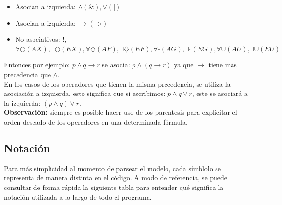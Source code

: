 \documentclass[11pt]{article}
\begin{document}
  \begin{itemize}
    \item Asocian a izquierda: $\land (\&) , \lor (|)$
    \item Asocian a izquierda: $\rightarrow (\texttt{->})$
    \item No asociativos: !, $\forall \bigcirc (AX), \exists \bigcirc (EX), \forall \diamondsuit (AF), \exists \diamondsuit (EF),
          \forall \square (AG), \exists \square (EG), \forall \cup (AU), \exists \cup (EU)$
  \end{itemize}

  Entonces por ejemplo: $p \land q \rightarrow r$ se asocia: $p \land (q \rightarrow r)$
  ya que $\rightarrow$ tiene más precedencia que $\land$. \\
  
  En los casos de los operadores que tienen la misma precedencia, se utiliza
  la asociación a izquierda, esto significa que si escribimos: $p \land q \lor r$, 
  este se asociará a la izquierda: $(p \land q) \lor r$. \\

  \textbf{Observación:} siempre es posible hacer uso de los parentesis para 
  explicitar el orden deseado de los operadores en una determinada fórmula.

\subsection{Notación}

Para más simplicidad al momento de parsear el modelo, cada símblolo
se representa de manera distinta en el código. A modo de referencia,
se puede consultar de forma rápida la siguiente tabla para entender
qué significa la notación utilizada a lo largo de todo el programa.
\end{document}

